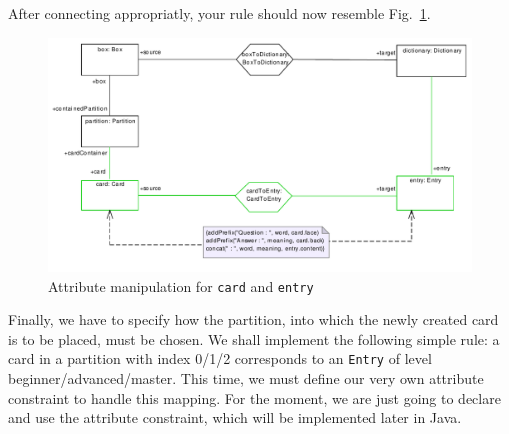 After connecting appropriatly, your rule should now resemble Fig.~\ref{fig:cardtoentry_2}.

\begin{figure}[htbp]
\begin{center}
  \includegraphics[width=\textwidth]{pics/tggBilder/tggRule/tgg20}
  \caption{Attribute manipulation for \texttt{card} and \texttt{entry}}
  \label{fig:cardtoentry_2}
\end{center}
\end{figure}
\FloatBarrier

Finally, we have to specify how the partition, into which the newly created card is to be placed, must be chosen.
We shall implement the following simple rule: a card in a partition with index 0/1/2 corresponds to an \texttt{Entry} of level beginner/advanced/master.
This time, we must define our very own attribute constraint to handle this mapping.
For the moment, we are just going to declare and use the attribute constraint, which will be implemented later in Java.


